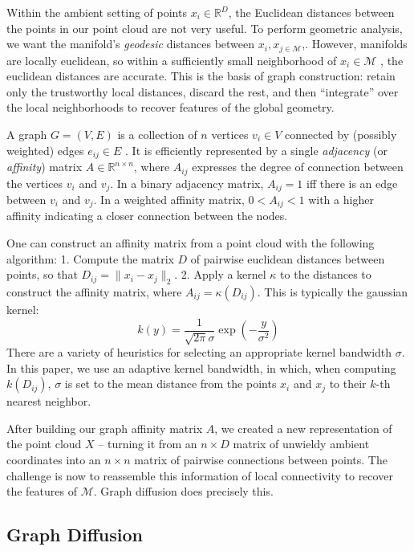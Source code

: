 \documentclass[
  letterpaper,
  DIV=11,
  numbers=noendperiod]{scrartcl}
\theoremstyle{plain}
\theoremstyle{plain}
\theoremstyle{definition}
\theoremstyle{definition}
\theoremstyle{remark}
\begin{document}
Within the ambient setting of points \(x_{i} \in \mathbb{R}^D\), the
Euclidean distances between the points in our point cloud are not very
useful. To perform geometric analysis, we want the manifold's
\emph{geodesic} distances between \(x_{i}, x_{j \in \mathcal{M}}\),.
However, manifolds are locally euclidean, so within a sufficiently small
neighborhood of \(x_{i} \in \mathcal{M}\) , the euclidean distances are
accurate. This is the basis of graph construction: retain only the
trustworthy local distances, discard the rest, and then ``integrate''
over the local neighborhoods to recover features of the global geometry.

A graph \(G = (V, E)\) is a collection of \(n\) vertices \(v_{i} \in V\)
connected by (possibly weighted) edges \(e_{ij} \in E\) . It is
efficiently represented by a single \emph{adjacency} (or
\emph{affinity}) matrix \(A \in \mathbb{R}^{n \times n}\), where
\(A_{ij}\) expresses the degree of connection between the vertices
\(v_{i}\) and \(v_{j}\). In a binary adjacency matrix, \(A_{ij}=1\) iff
there is an edge between \(v_{i}\) and \(v_{j}\). In a weighted affinity
matrix, \(0<A_{ij}<1\) with a higher affinity indicating a closer
connection between the nodes.

One can construct an affinity matrix from a point cloud with the
following algorithm: 1. Compute the matrix \(D\) of pairwise euclidean
distances between points, so that \(D_{ij}=\|x_{i}-x_{j}\|_{2}\). 2.
Apply a kernel \(\kappa\) to the distances to construct the affinity
matrix, where \(A_{ij} = \kappa(D_{ij})\). This is typically the
gaussian kernel: \[
k(y) = \frac{1}{\sqrt{ 2\pi }\sigma}\exp\left( -\frac{y}{\sigma^2} \right)
\] There are a variety of heuristics for selecting an appropriate kernel
bandwidth \(\sigma\). In this paper, we use an adaptive kernel
bandwidth, in which, when computing \(k(D_{ij})\), \(\sigma\) is set to
the mean distance from the points \(x_{i}\) and \(x_{j}\) to their
\(k\)-th nearest neighbor.

After building our graph affinity matrix \(A\), we created a new
representation of the point cloud \(X\) -- turning it from an
\(n \times D\) matrix of unwieldy ambient coordinates into an
\(n \times n\) matrix of pairwise connections between points. The
challenge is now to reassemble this information of local connectivity to
recover the features of \(\mathcal{M}\). Graph diffusion does precisely
this.

\subsection{Graph Diffusion}\label{graph-diffusion}
\end{document}
